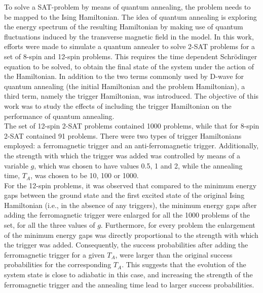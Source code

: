 \documentclass[main.tex]{subfiles}
\begin{document}
To solve a SAT-problem by means of quantum annealing, the problem needs to be mapped to the Ising Hamiltonian. The idea of quantum annealing is exploring the energy spectrum of the resulting Hamiltonian by making use of quantum fluctuations induced by the transverse magnetic field in the model. In this work, efforts were made to simulate a quantum annealer to solve 2-SAT problems for a set of 8-spin and 12-spin problems. This requires the time dependent Schr{\"o}dinger equation to be solved, to obtain the final state of the system under the action of the Hamiltonian. In addition to the two terms commonly used by D-wave for quantum annealing (the initial Hamiltonian and the problem Hamiltonian), a third term, namely the trigger Hamiltonian, was introduced.  The objective of this work was to study the effects of including the trigger Hamiltonian on the performance of quantum annealing.\\
The set of 12-spin 2-SAT problems contained 1000 problems, while that for 8-spin 2-SAT contained 91 problems. There were two types of trigger Hamiltonians employed: a ferromagnetic trigger and an anti-ferromagnetic trigger. Additionally, the strength with which the trigger was added was controlled by means of a variable $g$, which was chosen to have values 0.5, 1 and 2, while the annealing time, $T_A$, was chosen to be 10, 100 or 1000.\\

For the 12-spin problems, it was observed that compared to the minimum energy gaps between the ground state and the first excited state of the original Ising Hamiltonian (i.e., in the absence of any triggers), the minimum energy gaps after adding the ferromagnetic trigger were enlarged for all the 1000 problems of the set, for all the three values of $g$. Furthermore, for every problem the enlargement of the minimum energy gaps was directly proportional to the strength with which the trigger was added. Consequently, the success probabilities after adding the ferromagnetic trigger for a given $T_A$, were larger than the original success probabilities for the corresponding $T_A$. This suggests that the evolution of the system state is close to adiabatic in this case, and increasing the strength of the ferromagnetic trigger and the annealing time lead to larger success probabilities.\\
\end{document}
